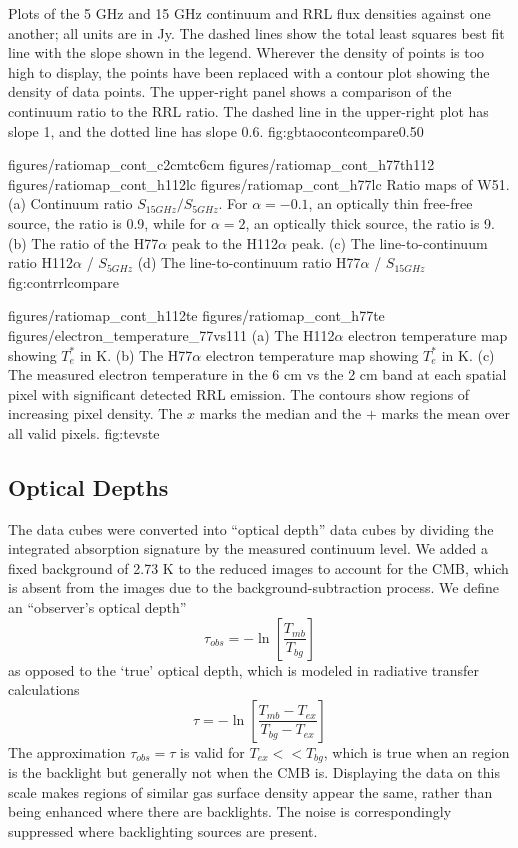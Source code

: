 {Plots of the 5 GHz and 15 GHz continuum and RRL flux densities against one
another; all units are in Jy.  The dashed lines show the total least squares
best fit line with the slope shown in the legend.  Wherever the density of
points is too high to display, the points have been replaced with a contour
plot showing the density of data points.  The upper-right panel shows a
comparison of the continuum ratio to the RRL ratio.  The dashed line in the
upper-right plot has slope 1, and the dotted line has slope 0.6.}
{fig:gbtaocontcompare}{0.5}{0}

\clearpage
\FigureFour
{figures/ratiomap_cont_c2cmtc6cm}
{figures/ratiomap_cont_h77th112}
{figures/ratiomap_cont_h112lc}
{figures/ratiomap_cont_h77lc}
{Ratio maps of W51.  
(a) Continuum ratio $S_{15 GHz} / S_{5 GHz}$.  For $\alpha=-0.1$, an optically
thin free-free source, the ratio is 0.9, while for $\alpha=2$, an optically thick source,
the ratio is 9.
(b) The ratio of the H77$\alpha$ peak to the H112$\alpha$ peak.
(c) The line-to-continuum ratio H112$\alpha$ / $S_{5 GHz}$
(d) The line-to-continuum ratio H77$\alpha$ / $S_{15 GHz}$
}
{fig:contrrlcompare}

\FigureThreePDF
{figures/ratiomap_cont_h112te}
{figures/ratiomap_cont_h77te}
{figures/electron_temperature_77vs111}
{(a) The H112$\alpha$ electron temperature map showing $T_e^*$ in K. 
(b) The H77$\alpha$ electron temperature map showing $T_e^*$ in K.
(c) The measured electron temperature in the 6 cm vs the 2 cm band at each spatial
pixel with significant detected RRL emission.  The contours show regions of
increasing pixel density.  The $x$ marks the median and the $+$ marks the mean
over all valid pixels.
}
{fig:tevste}%
\clearpage

\subsection{Optical Depths}

The data cubes were converted into ``optical depth'' data cubes by dividing the
integrated \formaldehyde absorption signature by the measured continuum level.
We added a fixed background of 2.73 K to the reduced images to account for the
CMB, which is absent from the images due to the background-subtraction
process.  We define an ``observer's optical depth''
\begin{equation}
    \tau_{obs} = -\ln\left[\frac{T_{mb}}{T_{bg}}\right]
\end{equation}
as opposed to the `true' optical depth, which is modeled in radiative transfer
calculations
\begin{equation}
    \tau = -\ln\left[\frac{T_{mb}-T_{ex}}{T_{bg}-T_{ex}}\right]
\end{equation}
The approximation $\tau_{obs} = \tau$ is valid for $T_{ex} << T_{bg}$, which is
true when an \hii region is the backlight but generally not when the CMB is.
Displaying the data on this scale makes regions of similar gas surface density
appear the same, rather than being enhanced where there are backlights.  The
noise is correspondingly suppressed where backlighting sources are present.


